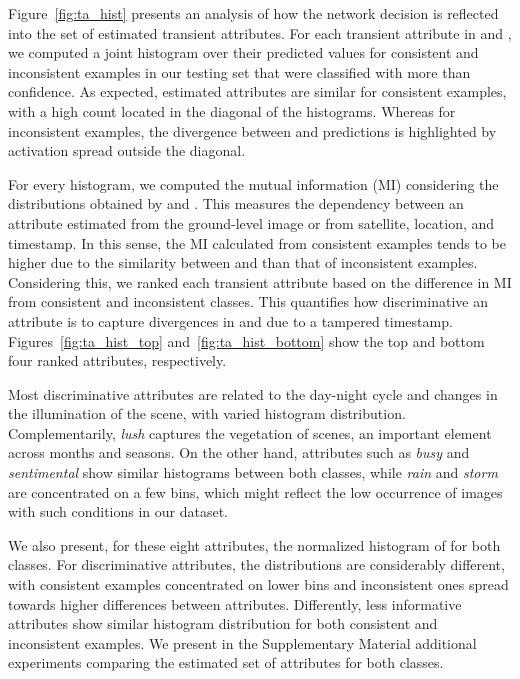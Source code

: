 \documentclass[journal]{IEEEtran}
\begin{document}
        Figure~\ref{fig:ta_hist} presents an analysis of how the network decision is reflected into the set of estimated transient attributes. For each transient attribute in  and , we computed a joint histogram over their predicted values for consistent and inconsistent examples in our testing set that were classified with more than  confidence. As expected, estimated attributes are similar for consistent examples, with a high count located in the diagonal of the histograms. Whereas for inconsistent examples, the divergence between  and  predictions is highlighted by activation spread outside the diagonal. 
        
        
        For every histogram, we computed the mutual information (MI) considering the distributions obtained by  and . This measures the dependency between an attribute estimated from the ground-level image or from satellite, location, and timestamp. In this sense, the MI calculated from consistent examples tends to be higher due to the similarity between  and  than that of inconsistent examples. Considering this, we ranked each transient attribute based on the difference in MI from consistent and inconsistent classes. This quantifies how discriminative an attribute is to capture divergences in  and  due to a tampered timestamp. Figures~\ref{fig:ta_hist_top} and~\ref{fig:ta_hist_bottom} show the top and bottom four ranked attributes, respectively. 
        
        Most discriminative attributes are related to the day-night cycle and changes in the illumination of the scene, with varied histogram distribution. Complementarily, \textit{lush} captures the vegetation of scenes, an important element across months and seasons. On the other hand, attributes such as \textit{busy} and \textit{sentimental} show similar histograms between both classes, while \textit{rain} and \textit{storm} are concentrated on a few bins, which might reflect the low occurrence of images with such conditions in our dataset. 
        
        We also present, for these eight attributes, the normalized histogram of  for both classes. For discriminative attributes, the distributions are considerably different, with consistent examples concentrated on lower bins and inconsistent ones spread towards higher differences between attributes. Differently, less informative attributes show similar histogram distribution for both consistent and inconsistent examples. We present in the Supplementary Material additional experiments comparing the estimated set of attributes for both classes.
        
\end{document}
